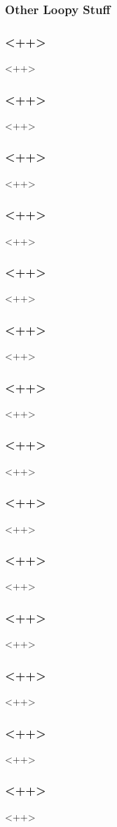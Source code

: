 \begin{frame}[fragile]
\frametitle{Other Loopy Stuff}
\end{frame}

\begin{frame}[fragile]
\frametitle{<++>}
<++>
\end{frame}

\begin{frame}[fragile]
\frametitle{<++>}
<++>
\end{frame}

\begin{frame}[fragile]
\frametitle{<++>}
<++>
\end{frame}

\begin{frame}[fragile]
\frametitle{<++>}
<++>
\end{frame}

\begin{frame}[fragile]
\frametitle{<++>}
<++>
\end{frame}

\begin{frame}[fragile]
\frametitle{<++>}
<++>
\end{frame}

\begin{frame}[fragile]
\frametitle{<++>}
<++>
\end{frame}

\begin{frame}[fragile]
\frametitle{<++>}
<++>
\end{frame}

\begin{frame}[fragile]
\frametitle{<++>}
<++>
\end{frame}

\begin{frame}[fragile]
\frametitle{<++>}
<++>
\end{frame}

\begin{frame}[fragile]
\frametitle{<++>}
<++>
\end{frame}

\begin{frame}[fragile]
\frametitle{<++>}
<++>
\end{frame}

\begin{frame}[fragile]
\frametitle{<++>}
<++>
\end{frame}

\begin{frame}[fragile]
\frametitle{<++>}
<++>
\end{frame}

